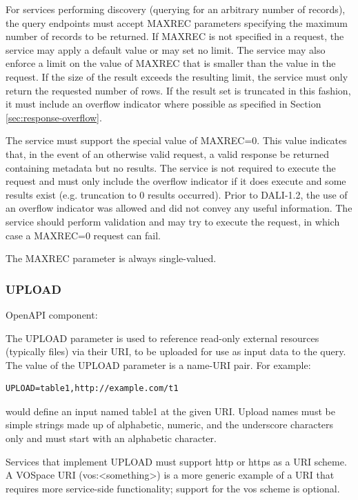 \documentclass[11pt,letter]{ivoa}
\begin{document}
For services performing discovery (querying for an arbitrary number of
records), the query endpoints must accept MAXREC parameters specifying the maximum
number of records to be returned. If MAXREC is not specified in a request, the
service may apply a default value or may set no limit. The service may also
enforce a limit on the value of MAXREC that is smaller than the value in the
request. If the size of the result exceeds the resulting limit, the service must
only return the requested number of rows. If the result set is truncated in this
fashion, it must include an overflow indicator where possible as specified in Section \ref{sec:response-overflow}.

The service must support the special value of MAXREC=0. This value indicates
that, in the event of an otherwise valid request, a valid response be returned
containing metadata but no results. The service is not required to execute the
request and must only include the overflow indicator if it does execute and some
results exist (e.g. truncation to 0 results occurred). Prior to DALI-1.2, the 
use of an overflow indicator was allowed and did not convey any useful information.
The service should perform validation and may try to execute the request, in which case
a MAXREC=0 request can fail.

The MAXREC parameter is always single-valued.

\subsubsection{UPLOAD}
\label{sec:UPLOAD}
OpenAPI component:\\ 

The UPLOAD parameter is used to reference read-only external resources
(typically files) via their URI, to be uploaded for use as input data to
the query. The value of the UPLOAD parameter is a name-URI pair. For
example:

\begin{verbatim}
UPLOAD=table1,http://example.com/t1
\end{verbatim}

\noindent
would define an input named table1 at the given URI. Upload names must be
simple strings made up of alphabetic, numeric, and the underscore characters
only and must start with an alphabetic character.

Services that implement UPLOAD must support http or https as a URI scheme.
A VOSpace URI (vos:<something>)  is a
more generic example of a URI that requires more service-side functionality;
support for the vos scheme is optional.
\end{document}
